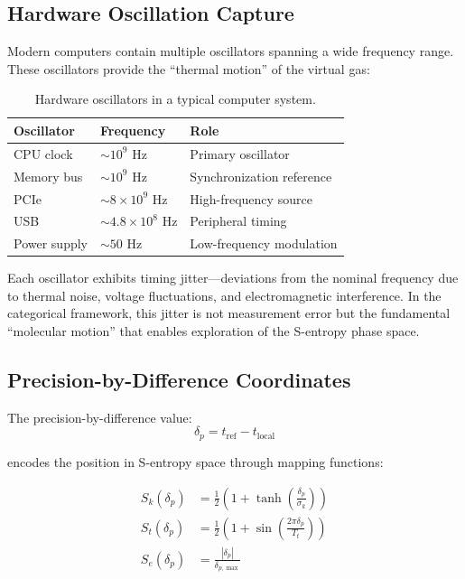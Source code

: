 \subsection{Hardware Oscillation Capture}

Modern computers contain multiple oscillators spanning a wide frequency range. These oscillators provide the ``thermal motion'' of the virtual gas:

\begin{table}[h]
\centering
\begin{tabular}{lll}
\hline
\textbf{Oscillator} & \textbf{Frequency} & \textbf{Role} \\
\hline
CPU clock & $\sim 10^9$ Hz & Primary oscillator \\
Memory bus & $\sim 10^9$ Hz & Synchronization reference \\
PCIe & $\sim 8 \times 10^9$ Hz & High-frequency source \\
USB & $\sim 4.8 \times 10^8$ Hz & Peripheral timing \\
Power supply & $\sim 50$ Hz & Low-frequency modulation \\
\hline
\end{tabular}
\caption{Hardware oscillators in a typical computer system.}
\label{tab:hardware_oscillators}
\end{table}

Each oscillator exhibits timing jitter—deviations from the nominal frequency due to thermal noise, voltage fluctuations, and electromagnetic interference. In the categorical framework, this jitter is not measurement error but the fundamental ``molecular motion'' that enables exploration of the S-entropy phase space.

\subsection{Precision-by-Difference Coordinates}

The precision-by-difference value:
\begin{equation}
\delta_p = t_{\text{ref}} - t_{\text{local}}
\end{equation}

encodes the position in S-entropy space through mapping functions:

\begin{align}
S_k(\delta_p) &= \frac{1}{2}\left(1 + \tanh\left(\frac{\delta_p}{\sigma_k}\right)\right) \label{eq:Sk_map} \\
S_t(\delta_p) &= \frac{1}{2}\left(1 + \sin\left(\frac{2\pi\delta_p}{T_t}\right)\right) \label{eq:St_map} \\
S_e(\delta_p) &= \frac{|\delta_p|}{\delta_{p,\max}} \label{eq:Se_map}
\end{align}

